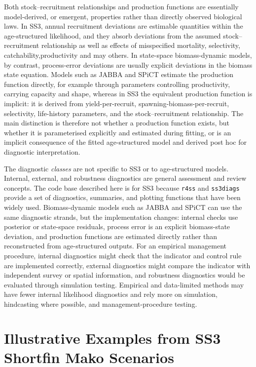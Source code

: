 \documentclass[11pt,a4paper]{article}
\begin{document}
Both stock--recruitment relationships and production functions are essentially model-derived, or emergent, properties rather than directly observed biological laws. In SS3, annual recruitment deviations are estimable quantities within the age-structured likelihood, and they absorb deviations from the assumed stock--recruitment relationship as well as effects of misspecified mortality, selectivity, catchability,productivity and may others. In state-space biomass-dynamic models, by contrast, process-error deviations are usually explicit deviations in the biomass state equation. Models such as JABBA and SPiCT estimate the production function directly, for example through parameters controlling productivity, carrying capacity and shape, whereas in SS3 the equivalent production function is implicit: it is derived from yield-per-recruit, spawning-biomass-per-recruit, selectivity, life-history parameters, and the stock--recruitment relationship. The main distinction is therefore not whether a production function exists, but whether it is parameterised explicitly and estimated during fitting, or is an implicit consequence of the fitted age-structured model and derived post hoc for diagnostic interpretation. 

The diagnostic \textit{classes} are not specific to SS3 or to age-structured models. Internal, external, and robustness diagnostics are general assessment and review concepts. The code base described here is for SS3 because \texttt{r4ss} and \texttt{ss3diags} provide a set of diagnostics, summaries, and plotting functions that have been widely used. Biomass-dynamic models such as JABBA and SPiCT can use the same diagnostic strands, but the implementation changes: internal checks use posterior or state-space residuals, process error is an explicit biomass-state deviation, and production functions are estimated directly rather than reconstructed from age-structured outputs. For an empirical management procedure, internal diagnostics might check that the indicator and control rule are implemented correctly, external diagnostics might compare the indicator with independent survey or spatial information, and robustness diagnostics would be evaluated through simulation testing. Empirical and data-limited methods may have fewer internal likelihood diagnostics and rely more on simulation, hindcasting where possible, and management-procedure testing.

\section{Illustrative Examples from SS3 Shortfin Mako Scenarios}
\end{document}
